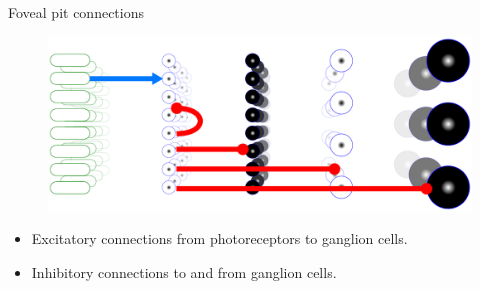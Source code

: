 \documentclass[17pt,mathserif]{beamer}
\begin{document}
    \begin{frame}{Foveal pit connections}
      \vspace*{-4em}
      \begin{figure}
        \includegraphics[scale=0.35]{./retina-model}
      \end{figure}
      \vspace*{-0.5em}
      \begin{minipage}{\textwidth}
        \begin{itemize}
          \normalsize           
          \item Excitatory connections from photoreceptors to ganglion cells.
          \item Inhibitory connections to and from ganglion cells.
        \end{itemize}
      \end{minipage}
    \end{frame}
\end{document}
